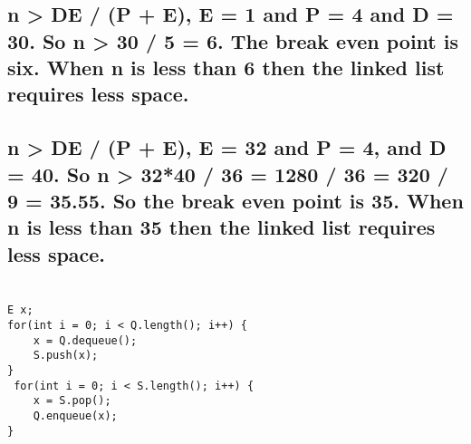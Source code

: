 \documentclass[11pt]{article}
\begin{document}
\section{}
\label{sec:org446cae2}
\subsection{n \textgreater{} DE / (P + E), E = 1 and P = 4 and D = 30. So n \textgreater{} 30 / 5 = 6. The break even point is six. When n is less than 6 then the linked list requires less space.}
\label{sec:org3674738}
\subsection{n \textgreater{} DE / (P + E), E = 32 and P = 4, and D = 40. So n \textgreater{} 32*40 / 36 = 1280 / 36 = 320 / 9 = 35.55. So the break even point is 35. When n is less than 35 then the linked list requires less space.}
\label{sec:orgac26b0a}
\section{}
\label{sec:orgb332bd8}
\begin{verbatim}
E x;
for(int i = 0; i < Q.length(); i++) {
    x = Q.dequeue();
    S.push(x);
}
 for(int i = 0; i < S.length(); i++) {
    x = S.pop();
    Q.enqueue(x);
}
\end{verbatim}
\end{document}
